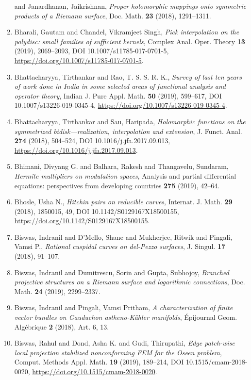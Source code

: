 \begin{enumerate}
and Janardhanan, Jaikrishnan, {\em Proper holomorphic mappings onto symmetric products of a
{R}iemann surface}, Doc. Math. {\bf 23} (2018), 1291--1311.
\item Bharali, Gautam and Chandel, Vikramjeet Singh, {\em Pick interpolation on the polydisc: small families of
sufficient kernels}, Complex Anal. Oper. Theory {\bf 13} (2019), 2069--2093, DOI 10.1007/s11785-017-0701-5, \url{https://doi.org/10.1007/s11785-017-0701-5}.
\item Bhattacharyya, Tirthankar and Rao, T. S. S. R. K., {\em Survey of last ten years of work done in {I}ndia in some
selected areas of functional analysis and operator theory}, Indian J. Pure Appl. Math. {\bf 50} (2019), 599--617, DOI 10.1007/s13226-019-0345-4, \url{https://doi.org/10.1007/s13226-019-0345-4}.
\item Bhattacharyya, Tirthankar and Sau, Haripada, {\em Holomorphic functions on the symmetrized bidisk---realization,
interpolation and extension}, J. Funct. Anal. {\bf 274} (2018), 504--524, DOI 10.1016/j.jfa.2017.09.013, \url{https://doi.org/10.1016/j.jfa.2017.09.013}.
\item Bhimani, Divyang G. and Balhara, Rakesh and Thangavelu,
Sundaram, {\em Hermite multipliers on modulation spaces}, Analysis and partial differential equations: perspectives from
developing countries {\bf 275} (2019), 42--64.
\item Bhosle, Usha N., {\em Hitchin pairs on reducible curves}, Internat. J. Math. {\bf 29} (2018), 1850015, 49, DOI 10.1142/S0129167X18500155, \url{https://doi.org/10.1142/S0129167X18500155}.
\item Biswas, Indranil and D'Mello, Shane and Mukherjee, Ritwik and
Pingali, Vamsi P., {\em Rational cuspidal curves on del-{P}ezzo surfaces}, J. Singul. {\bf 17} (2018), 91--107.
\item Biswas, Indranil and Dumitrescu, Sorin and Gupta, Subhojoy, {\em Branched projective structures on a {R}iemann surface and
logarithmic connections}, Doc. Math. {\bf 24} (2019), 2299--2337.
\item Biswas, Indranil and Pingali, Vamsi Pritham, {\em A characterization of finite vector bundles on {G}auduchon
astheno-{K}\"{a}hler manifolds}, \'{E}pijournal Geom. Alg\'{e}brique {\bf 2} (2018), Art. 6, 13.
\item Biswas, Rahul and Dond, Asha K. and Gudi, Thirupathi, {\em Edge patch-wise local projection stabilized nonconforming
{FEM} for the {O}seen problem}, Comput. Methods Appl. Math. {\bf 19} (2019), 189--214, DOI 10.1515/cmam-2018-0020, \url{https://doi.org/10.1515/cmam-2018-0020}.

\end{enumerate}
